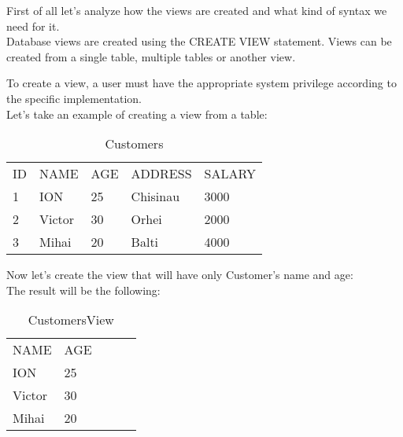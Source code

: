 First of all let's analyze how the views are created and what kind of syntax we need for it.\\
Database views are created using the CREATE VIEW statement. Views can be created from a single table, multiple tables or another view.

To create a view, a user must have the appropriate system privilege according to the specific implementation.\\



Let's take an example of creating a view from a table:\\
\begin{table}[]
\centering
\caption{Customers}
\label{my-label}
\begin{tabular}{lllll}
ID & NAME   & AGE & ADDRESS  & SALARY \\
1  & ION    & 25  & Chisinau & 3000   \\
2  & Victor & 30  & Orhei    & 2000   \\
3  & Mihai  & 20  & Balti    & 4000  
\end{tabular}
\end{table}
Now let's create the view that will have only Customer's name and age:\\

The result will be the following:\\
\begin{table}[]
\centering
\caption{CustomersView}
\begin{tabular}{lllll}
NAME   & AGE &  &  &  \\
ION    & 25  &  &  &  \\
Victor & 30  &  &  &  \\
Mihai  & 20  &  &  & 
\end{tabular}
\end{table}
\clearpage

